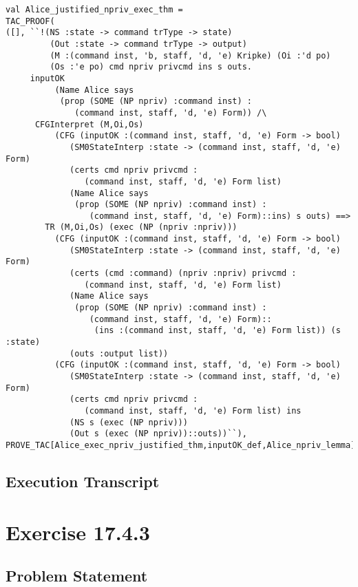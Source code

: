 \documentclass{article}
\begin{document}
\begin{verbatim}
val Alice_justified_npriv_exec_thm =
TAC_PROOF(
([], ``!(NS :state -> command trType -> state)
         (Out :state -> command trType -> output)
         (M :(command inst, 'b, staff, 'd, 'e) Kripke) (Oi :'d po)
         (Os :'e po) cmd npriv privcmd ins s outs.
	 inputOK
          (Name Alice says
           (prop (SOME (NP npriv) :command inst) :
              (command inst, staff, 'd, 'e) Form)) /\
	  CFGInterpret (M,Oi,Os)
          (CFG (inputOK :(command inst, staff, 'd, 'e) Form -> bool)
             (SM0StateInterp :state -> (command inst, staff, 'd, 'e) Form)
             (certs cmd npriv privcmd :
                (command inst, staff, 'd, 'e) Form list)
             (Name Alice says
              (prop (SOME (NP npriv) :command inst) :
                 (command inst, staff, 'd, 'e) Form)::ins) s outs) ==>
        TR (M,Oi,Os) (exec (NP (npriv :npriv)))
          (CFG (inputOK :(command inst, staff, 'd, 'e) Form -> bool)
             (SM0StateInterp :state -> (command inst, staff, 'd, 'e) Form)
             (certs (cmd :command) (npriv :npriv) privcmd :
                (command inst, staff, 'd, 'e) Form list)
             (Name Alice says
              (prop (SOME (NP npriv) :command inst) :
                 (command inst, staff, 'd, 'e) Form)::
                  (ins :(command inst, staff, 'd, 'e) Form list)) (s :state)
             (outs :output list))
          (CFG (inputOK :(command inst, staff, 'd, 'e) Form -> bool)
             (SM0StateInterp :state -> (command inst, staff, 'd, 'e) Form)
             (certs cmd npriv privcmd :
                (command inst, staff, 'd, 'e) Form list) ins
             (NS s (exec (NP npriv)))
             (Out s (exec (NP npriv))::outs))``),
PROVE_TAC[Alice_exec_npriv_justified_thm,inputOK_def,Alice_npriv_lemma])
\end{verbatim}

\subsection{Execution Transcript}
\label{sec:execution-transcript}



\section{Exercise 17.4.3}
\label{sec:exercise-17.4.3}

\subsection{Problem Statement}
\label{sec:problem-statement-1}
\end{document}
